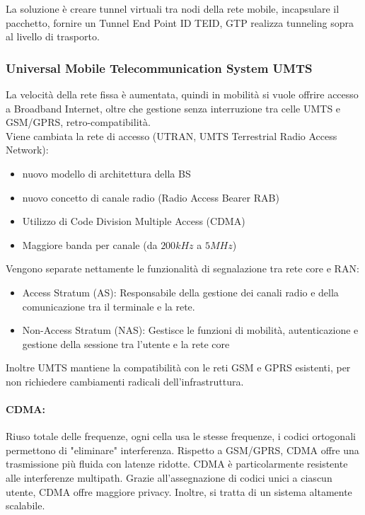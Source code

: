 La soluzione è creare tunnel virtuali tra nodi della rete mobile, incapsulare il pacchetto, fornire un Tunnel End Point ID TEID, GTP realizza tunneling sopra al livello di trasporto. \\

\subsubsection{Universal Mobile Telecommunication System UMTS}

La velocità della rete fissa è aumentata, quindi in mobilità si vuole offrire accesso a Broadband Internet, oltre che gestione senza interruzione tra celle UMTS e GSM/GPRS, retro-compatibilità.\\

Viene cambiata la rete di accesso (UTRAN, UMTS Terrestrial Radio Access Network):
\begin{itemize}
	\item nuovo modello di architettura della BS
	\item nuovo concetto di canale radio (Radio Access Bearer RAB)
	\item Utilizzo di Code Division Multiple Access (CDMA)
	\item Maggiore banda per canale (da $200kHz$ a $5MHz$)
\end{itemize}

Vengono separate nettamente le funzionalità di segnalazione tra rete core e RAN:
\begin{itemize}
	\item Access Stratum (AS): Responsabile della gestione dei canali radio e della comunicazione tra il terminale e la rete.
	\item Non-Access Stratum (NAS): Gestisce le funzioni di mobilità, autenticazione e gestione della sessione tra l'utente e la rete core
\end{itemize}

Inoltre UMTS mantiene la compatibilità con le reti GSM e GPRS esistenti, per non richiedere cambiamenti radicali dell'infrastruttura.\\

\paragraph{CDMA:} Riuso totale delle frequenze, ogni cella usa le stesse frequenze, i codici ortogonali permettono di "eliminare" interferenza. Rispetto a GSM/GPRS, CDMA offre una trasmissione più fluida con latenze ridotte. CDMA è particolarmente resistente alle interferenze multipath. Grazie all'assegnazione di codici unici a ciascun utente, CDMA offre maggiore privacy. Inoltre, si tratta di un sistema altamente scalabile.\\

